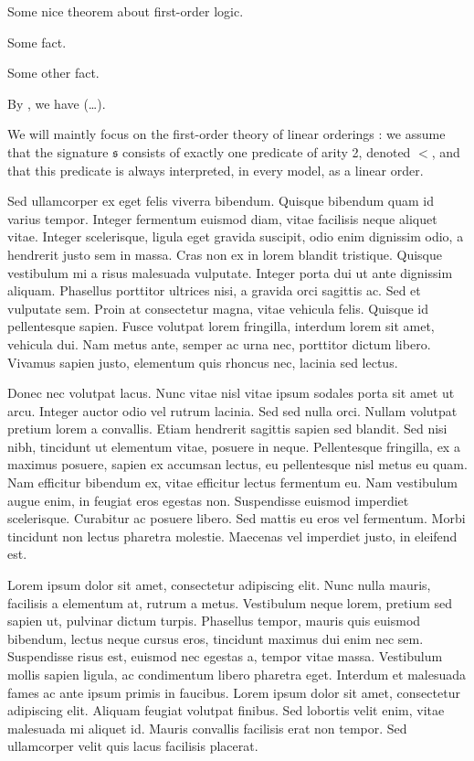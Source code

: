 \documentclass{fancy-article}
\begin{document}
\begin{theorem}
  Some nice theorem about first-order logic.
\end{theorem}

\begin{fact}
  \label{fact:1}
  Some fact.
\end{fact}

\begin{fact}
  \label{fact:2}
  Some other fact.
\end{fact}

By , we have (…).

\AP We will maintly focus on the first-order theory of linear orderings
\cite{rosenstein1982linear}: we assume that the signature $\mathfrak{s}$
consists of exactly one predicate of arity 2, denoted $<$, and that this
predicate is always interpreted, in every model, as a linear order.


\AP Sed ullamcorper ex eget felis viverra bibendum. Quisque bibendum quam id varius tempor. Integer fermentum euismod diam, vitae facilisis neque aliquet vitae. Integer scelerisque, ligula eget gravida suscipit, odio enim dignissim odio, a hendrerit justo sem in massa. Cras non ex in lorem blandit tristique. Quisque vestibulum mi a risus malesuada vulputate. Integer porta dui ut ante dignissim aliquam. Phasellus porttitor ultrices nisi, a gravida orci sagittis ac. Sed et vulputate sem. Proin at consectetur magna, vitae vehicula felis. Quisque id pellentesque sapien. Fusce volutpat lorem fringilla, interdum lorem sit amet, vehicula dui. Nam metus ante, semper ac urna nec, porttitor dictum libero. Vivamus sapien justo, elementum quis rhoncus nec, lacinia sed lectus.

\AP Donec nec volutpat lacus. Nunc vitae nisl vitae ipsum sodales porta sit amet ut arcu. Integer auctor odio vel rutrum lacinia. Sed sed nulla orci. Nullam volutpat pretium lorem a convallis. Etiam hendrerit sagittis sapien sed blandit. Sed nisi nibh, tincidunt ut elementum vitae, posuere in neque. Pellentesque fringilla, ex a maximus posuere, sapien ex accumsan lectus, eu pellentesque nisl metus eu quam. Nam efficitur bibendum ex, vitae efficitur lectus fermentum eu. Nam vestibulum augue enim, in feugiat eros egestas non. Suspendisse euismod imperdiet scelerisque. Curabitur ac posuere libero. Sed mattis eu eros vel fermentum. Morbi tincidunt non lectus pharetra molestie. Maecenas vel imperdiet justo, in eleifend est.

\AP Lorem ipsum dolor sit amet, consectetur adipiscing elit. Nunc nulla mauris, facilisis a elementum at, rutrum a metus. Vestibulum neque lorem, pretium sed sapien ut, pulvinar dictum turpis. Phasellus tempor, mauris quis euismod bibendum, lectus neque cursus eros, tincidunt maximus dui enim nec sem. Suspendisse risus est, euismod nec egestas a, tempor vitae massa. Vestibulum mollis sapien ligula, ac condimentum libero pharetra eget. Interdum et malesuada fames ac ante ipsum primis in faucibus. Lorem ipsum dolor sit amet, consectetur adipiscing elit. Aliquam feugiat volutpat finibus. Sed lobortis velit enim, vitae malesuada mi aliquet id. Mauris convallis facilisis erat non tempor. Sed ullamcorper velit quis lacus facilisis placerat.
\end{document}
